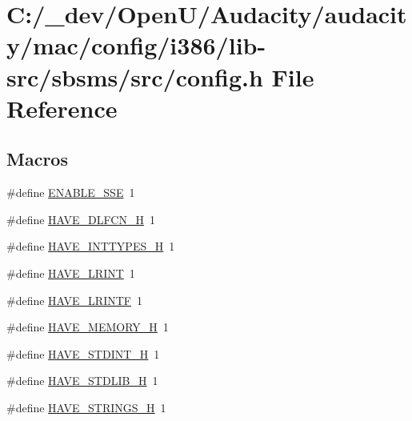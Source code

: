 \hypertarget{mac_2config_2i386_2lib-src_2sbsms_2src_2config_8h}{}\section{C\+:/\+\_\+dev/\+Open\+U/\+Audacity/audacity/mac/config/i386/lib-\/src/sbsms/src/config.h File Reference}
\label{mac_2config_2i386_2lib-src_2sbsms_2src_2config_8h}
\subsection*{Macros}
\begin{DoxyCompactItemize}
\item 
\#define \hyperlink{mac_2config_2i386_2lib-src_2sbsms_2src_2config_8h_a78733f2fe4d307e71805289e10bab74e}{E\+N\+A\+B\+L\+E\+\_\+\+S\+SE}~1
\item 
\#define \hyperlink{mac_2config_2i386_2lib-src_2sbsms_2src_2config_8h_a0ee1617ff2f6885ef384a3dd46f9b9d7}{H\+A\+V\+E\+\_\+\+D\+L\+F\+C\+N\+\_\+H}~1
\item 
\#define \hyperlink{mac_2config_2i386_2lib-src_2sbsms_2src_2config_8h_ab90a030ff2790ebdc176660a6dd2a478}{H\+A\+V\+E\+\_\+\+I\+N\+T\+T\+Y\+P\+E\+S\+\_\+H}~1
\item 
\#define \hyperlink{mac_2config_2i386_2lib-src_2sbsms_2src_2config_8h_a2bc3bc313571661387f686459daa7869}{H\+A\+V\+E\+\_\+\+L\+R\+I\+NT}~1
\item 
\#define \hyperlink{mac_2config_2i386_2lib-src_2sbsms_2src_2config_8h_ae39145bdf6b9b18a6b3c51f3bf4c4d54}{H\+A\+V\+E\+\_\+\+L\+R\+I\+N\+TF}~1
\item 
\#define \hyperlink{mac_2config_2i386_2lib-src_2sbsms_2src_2config_8h_ae93a78f9d076138897af441c9f86f285}{H\+A\+V\+E\+\_\+\+M\+E\+M\+O\+R\+Y\+\_\+H}~1
\item 
\#define \hyperlink{mac_2config_2i386_2lib-src_2sbsms_2src_2config_8h_ab6cd6d1c63c1e26ea2d4537b77148354}{H\+A\+V\+E\+\_\+\+S\+T\+D\+I\+N\+T\+\_\+H}~1
\item 
\#define \hyperlink{mac_2config_2i386_2lib-src_2sbsms_2src_2config_8h_a9e0e434ec1a6ddbd97db12b5a32905e0}{H\+A\+V\+E\+\_\+\+S\+T\+D\+L\+I\+B\+\_\+H}~1
\item 
\#define \hyperlink{mac_2config_2i386_2lib-src_2sbsms_2src_2config_8h_a405d10d46190bcb0320524c54eafc850}{H\+A\+V\+E\+\_\+\+S\+T\+R\+I\+N\+G\+S\+\_\+H}~1
\item 

\end{DoxyCompactItemize}
